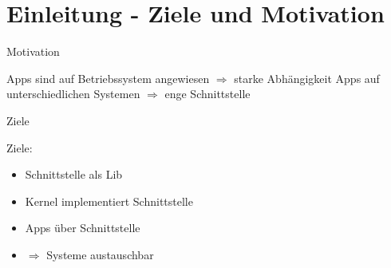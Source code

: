 \section{Einleitung - Ziele und Motivation}


\begin{frame}{Motivation}
    \begin{Large}
        Apps sind auf Betriebssystem angewiesen \newline
        $\Rightarrow$ starke Abhängigkeit \newline
        \newline
        Apps auf unterschiedlichen Systemen \newline
        $\Rightarrow$ enge Schnittstelle \newline
    \end{Large}
\end{frame}


\begin{frame}{Ziele}
    \begin{Large}
        Ziele:
    \end{Large}
    \vspace{15pt}

    \begin{itemize}
        \item Schnittstelle als Lib
        \item Kernel implementiert Schnittstelle
        \item Apps über Schnittstelle
        \item [] \quad $\Rightarrow$ Systeme austauschbar
    \end{itemize}
\end{frame}


